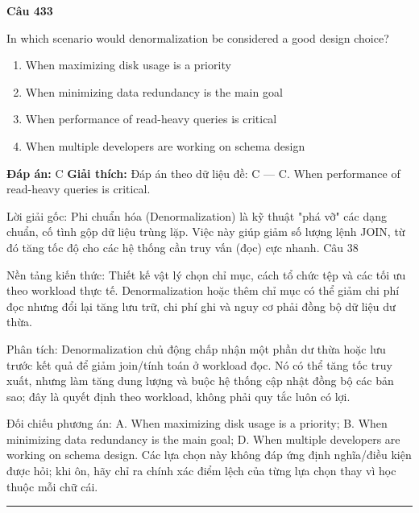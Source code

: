 \documentclass[11pt,a4paper]{article}
\newenvironment{question}[1]{%
  \par\vspace{1em}\noindent\textbf{\large Câu #1}\par\vspace{0.4em}
}{%
  \par\vspace{1em}\hrule\vspace{0.6em}
}
\newenvironment{choices}{%
  \begin{enumerate}[label=\textbf{\Alph*.},leftmargin=2.2em,itemsep=2pt,topsep=3pt]
}{%
  \end{enumerate}
}
\newcommand{\choice}{\item}
\begin{document}
\begin{question}{433}
In which scenario would denormalization be considered a good design choice?
\begin{choices}
\choice When maximizing disk usage is a priority
\choice When minimizing data redundancy is the main goal
\choice When performance of read-heavy queries is critical
\choice When multiple developers are working on schema design
\end{choices}
\textbf{Đáp án:} C
\textbf{Giải thích:} Đáp án theo dữ liệu đề: C — C. When performance of read-heavy queries is critical.

Lời giải gốc: Phi chuẩn hóa (Denormalization) là kỹ thuật "phá vỡ" các dạng chuẩn, cố tình gộp dữ liệu trùng lặp. Việc này giúp giảm số lượng lệnh JOIN, từ đó tăng tốc độ cho các hệ thống cần truy vấn (đọc) cực nhanh. Câu 38

Nền tảng kiến thức: Thiết kế vật lý chọn chỉ mục, cách tổ chức tệp và các tối ưu theo workload thực tế. Denormalization hoặc thêm chỉ mục có thể giảm chi phí đọc nhưng đổi lại tăng lưu trữ, chi phí ghi và nguy cơ phải đồng bộ dữ liệu dư thừa.

Phân tích: Denormalization chủ động chấp nhận một phần dư thừa hoặc lưu trước kết quả để giảm join/tính toán ở workload đọc. Nó có thể tăng tốc truy xuất, nhưng làm tăng dung lượng và buộc hệ thống cập nhật đồng bộ các bản sao; đây là quyết định theo workload, không phải quy tắc luôn có lợi.

Đối chiếu phương án: A. When maximizing disk usage is a priority; B. When minimizing data redundancy is the main goal; D. When multiple developers are working on schema design. Các lựa chọn này không đáp ứng định nghĩa/điều kiện được hỏi; khi ôn, hãy chỉ ra chính xác điểm lệch của từng lựa chọn thay vì học thuộc mỗi chữ cái.
\end{question}
\end{document}
